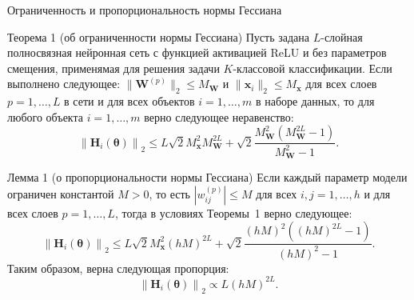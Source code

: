 \documentclass[aspectratio=169]{beamer}
\begin{document}
\begin{frame}{Ограниченность и пропорциональность нормы Гессиана}
    \fontsize{9pt}{10pt}\selectfont
    \vspace{1em}
    \begin{block}{Теорема 1 (об ограниченности нормы Гессиана)}
        \vspace{-0.5em}
        Пусть задана $L$-слойная полносвязная нейронная сеть с функцией активацией ReLU и без параметров смещения, применямая для решения задачи $K$-классовой классификации. Если выполнено следующее: $\| \mathbf{W}^{(p)} \|_2 \leqslant M_{\mathbf{W}}$ и $\| \mathbf{x}_i \|_2 \leqslant M_{\mathbf{x}}$ для всех слоев $p = 1, \ldots, L$ в сети и для всех объектов $i = 1, \ldots, m$ в наборе данных, то для любого объекта $i = 1, \ldots, m$ верно следующее неравенство:
        \vspace{-1em}
        \[ \left\| \mathbf{H}_i(\boldsymbol{\theta}) \right\|_2 \leqslant L \sqrt{2} M_{\mathbf{x}}^2 M_{\mathbf{W}}^{2L} + \sqrt{2} \dfrac{M_{\mathbf{W}}^2 (M_{\mathbf{W}}^{2L} - 1)}{M_{\mathbf{W}}^2 - 1}. \]
    \end{block}
    \vspace{-1.25em}
    \begin{block}{Лемма 1 (о пропорциональности нормы Гессиана)}
        \vspace{-0.5em}
        Если каждый параметр модели ограничен константой $M > 0$, то есть $|w_{ij}^{(p)}| \leqslant M$ для всех $i, j = 1, \ldots, h$ и для всех слоев $p = 1, \ldots, L$, тогда в условиях Теоремы~1 верно следующее:
        \vspace{-0.5em}
        \[ \left\| \mathbf{H}_i(\boldsymbol{\theta}) \right\|_2 \leqslant L \sqrt{2} M_{\mathbf{x}}^2 (hM)^{2L} + \sqrt{2} \dfrac{(hM)^2 ((hM)^{2L} - 1)}{(hM)^2 - 1}. \]
        \vspace{-0.5em}
        Таким образом, верна следующая пропорция:
        \vspace{-0.5em}
        \[ \left\| \mathbf{H}_i(\boldsymbol{\theta}) \right\|_2 \propto L (hM)^{2L}. \]
    \end{block}
\end{frame}
\end{document}
